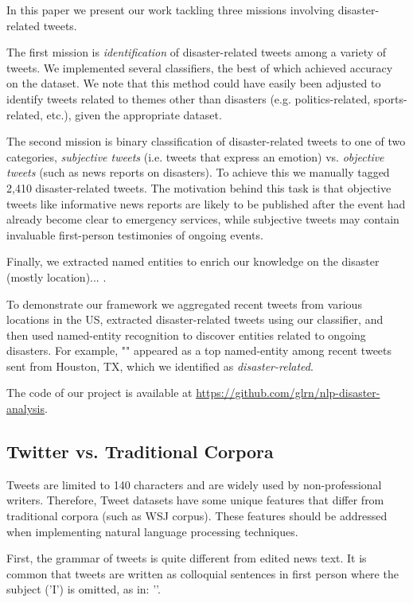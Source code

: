 \documentclass[letterpaper,twocolumn,10pt]{article}
\begin{document}
In this paper we present our work tackling three missions involving disaster-related tweets.

The first mission is \textit{identification} of disaster-related tweets among a variety of tweets. We implemented several classifiers, the best of which achieved \todo{\%} accuracy on the dataset. We note that this method could have easily been adjusted to identify tweets related to themes other than disasters (e.g. politics-related, sports-related, etc.), given the appropriate dataset.

The second mission is binary classification of disaster-related tweets to one of two categories, \textit{subjective tweets} (i.e. tweets that express an emotion) vs. \textit{objective tweets} (such as news reports on disasters). To achieve this we manually tagged 2,410 disaster-related tweets. The motivation behind this task is that objective tweets like informative news reports are likely to be published after the event had already become clear to emergency services, while subjective tweets may contain invaluable first-person testimonies of ongoing events.

Finally, we extracted named entities to enrich our knowledge on the disaster (mostly location)... .

To demonstrate our framework we aggregated recent tweets from various locations in the US, extracted disaster-related tweets using our classifier, and then used named-entity recognition to discover entities related to ongoing disasters. For example, "" appeared as a top named-entity among recent tweets sent from Houston, TX, which we identified as \textit{disaster-related}.

The code of our project is available at \url{https://github.com/glrn/nlp-disaster-analysis}.

\subsection{Twitter vs. Traditional Corpora}

Tweets are limited to 140 characters and are widely used by non-professional writers. Therefore, Tweet datasets have some unique features that differ from traditional corpora (such as WSJ corpus). These features should be addressed when implementing natural language processing techniques.

First, the grammar of tweets is quite different from edited news text. It is common that tweets are written as colloquial sentences in first person where the subject ('I') is omitted, as in: ''.
\end{document}
